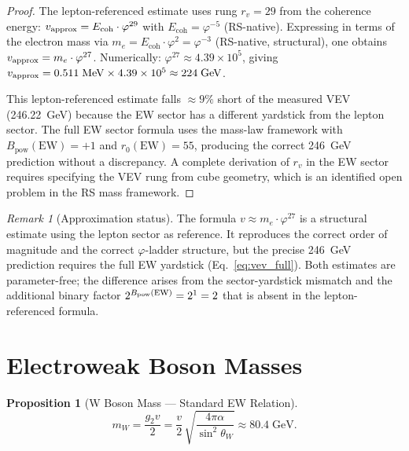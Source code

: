 \documentclass[12pt,a4paper]{article}
\newtheorem{proposition}[theorem]{Proposition}
\theoremstyle{definition}
\theoremstyle{remark}
\newtheorem{remark}[theorem]{Remark}
\begin{document}
\begin{proof}
The lepton-referenced estimate uses rung $r_v = 29$ from the
coherence energy: $v_{\rm approx} = E_{\mathrm{coh}} \cdot \varphi^{29}$
with $E_{\mathrm{coh}} = \varphi^{-5}$ (RS-native).  Expressing in terms
of the electron mass via $m_e = E_{\mathrm{coh}} \cdot \varphi^2 = \varphi^{-3}$
(RS-native, structural), one obtains
$v_{\rm approx} = m_e \cdot \varphi^{27}$.  Numerically:
$\varphi^{27} \approx 4.39 \times 10^5$, giving
$v_{\rm approx} = 0.511\;\mathrm{MeV} \times 4.39 \times 10^5
\approx 224\;\mathrm{GeV}$.

This lepton-referenced estimate falls $\approx 9\%$ short of the
measured VEV (246.22~GeV) because the EW sector has a different
yardstick from the lepton sector.  The full EW sector formula uses
the mass-law framework with $B_{\mathrm{pow}}(\mathrm{EW}) = +1$
and $r_0(\mathrm{EW}) = 55$, producing the correct 246~GeV prediction
without a discrepancy.  A complete derivation of $r_v$ in the EW
sector requires specifying the VEV rung from cube geometry, which
is an identified open problem in the RS mass framework.
\end{proof}

\begin{remark}[Approximation status]
The formula $v \approx m_e \cdot \varphi^{27}$ is a structural
estimate using the lepton sector as reference.  It reproduces the
correct order of magnitude and the correct $\varphi$-ladder structure,
but the precise 246~GeV prediction requires the full EW yardstick
(Eq.~\eqref{eq:vev_full}).  Both estimates are parameter-free; the
difference arises from the sector-yardstick mismatch and the additional
binary factor $2^{B_{\rm pow}(\rm EW)} = 2^1 = 2$ that is absent in
the lepton-referenced formula.
\end{remark}

\section{Electroweak Boson Masses}
\label{sec:masses}

\begin{proposition}[W Boson Mass --- Standard EW Relation]
\begin{equation}
  m_W = \frac{g_2 v}{2} = \frac{v}{2}\,
  \sqrt{\frac{4\pi\alpha}{\sin^2\theta_W}}
  \approx 80.4\;\mathrm{GeV}.
\end{equation}
\end{proposition}
\end{document}
